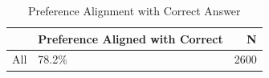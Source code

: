 \begin{table}[h]
\caption{Preference Alignment with Correct Answer}
\label{tab:preference_alignment}
\begin{tabular}{llr}
\toprule
 & Preference Aligned with Correct & N \\
\midrule
All & 78.2\% & 2600 \\
\bottomrule
\end{tabular}
\end{table}
